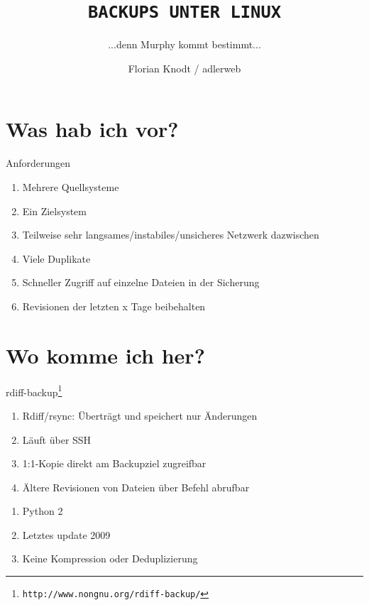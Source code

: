 \documentclass{beamer}
\title{\texttt{BACKUPS UNTER LINUX}}
\subtitle{...denn Murphy kommt bestimmt...}
\author{Florian Knodt / adlerweb}
\institute{LUG Mayen-Koblenz}
\begin{document}
\begin{frame}
  \maketitle
\end{frame}

\section{Was hab ich vor?}
\begin{frame}{Anforderungen}
	\begin{enumerate}[*]\pause
    	\item Mehrere Quellsysteme\pause
    	\item Ein Zielsystem\pause
    	\item Teilweise sehr langsames/instabiles/unsicheres Netzwerk dazwischen\pause
    	\item Viele Duplikate\pause
    	\item Schneller Zugriff auf einzelne Dateien in der Sicherung\pause
    	\item Revisionen der letzten x Tage beibehalten
  \end{enumerate}
\end{frame}

\section{Wo komme ich her?}
\begin{frame}{rdiff-backup\footnote{\texttt{http://www.nongnu.org/rdiff-backup/}}}
	\begin{enumerate}[+]\pause
    	\item Rdiff/rsync: Überträgt und speichert nur Änderungen\pause
    	\item Läuft über SSH\pause
    	\item 1:1-Kopie direkt am Backupziel zugreifbar\pause
    	\item Ältere Revisionen von Dateien über Befehl abrufbar\pause
  	\end{enumerate}
	\begin{enumerate}[-]
    	\item Python 2\pause
    	\item Letztes update 2009\pause
    	\item Keine Kompression oder Deduplizierung
  	\end{enumerate}
\end{frame}
\end{document}
